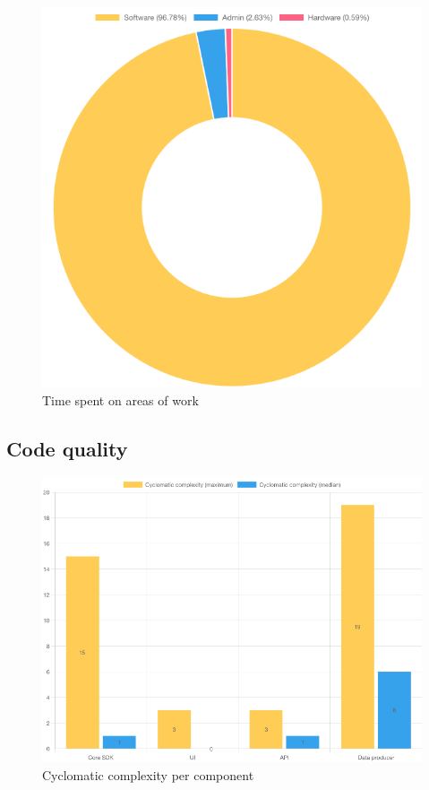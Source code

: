 \begin{figure}[h]
\centering
\includegraphics[scale=0.5]{04_Artefakte/01_Abbildungen/time-spent-on-types-of-work}
\caption[Time spent on areas of work]{Time spent on areas of work\protect}
\label{fig:timeSpentTypeOfWork}
\end{figure}


\subsection{Code quality}

\begin{figure}[h]
\centering
\includegraphics[scale=0.5]{04_Artefakte/01_Abbildungen/code-stats-complexity}
\caption[Cyclomatic complexity]{Cyclomatic complexity per component\protect}
\label{fig:cyclomaticComplexity}
\end{figure}

